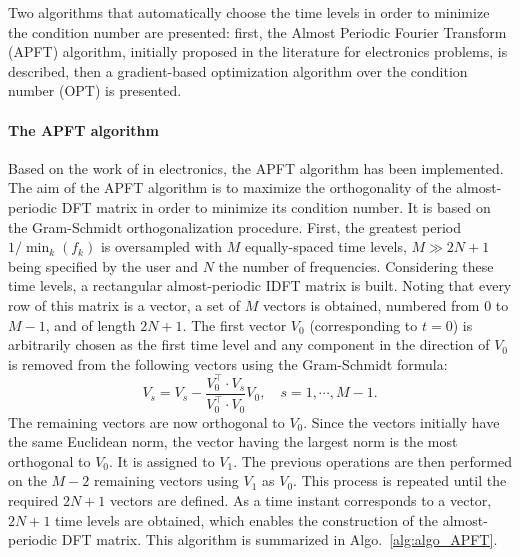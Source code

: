 
Two algorithms that automatically choose the time levels in order to
minimize the condition number are presented: first, the Almost
Periodic Fourier Transform (APFT) algorithm, initially proposed in the
 literature for electronics problems, is described, then a gradient-based
optimization algorithm over the condition number (OPT) is presented.

\paragraph{The APFT algorithm}
\label{sec:apft_algorithm}

Based on the work of \citet{Kundert1988} in
electronics, the APFT algorithm has been implemented.  The aim of the
APFT algorithm is to maximize the orthogonality of the almost-periodic
DFT matrix in order to minimize its condition number.  It is based on
the Gram-Schmidt orthogonalization procedure.  First, the greatest
period $1/\min_k(f_k)$ is oversampled with $M$ equally-spaced time
levels, $M\gg2N+1$ being specified by the user and $N$ the number of
frequencies. Considering these time levels, a rectangular
almost-periodic IDFT matrix is built. Noting that every row of this
matrix is a vector, a set of $M$ vectors is obtained, numbered from 0
to $M-1$, and of length $2N+1$. The first vector $V_0$ (corresponding
to $t=0$) is arbitrarily chosen as the first time level and any
component in the direction of $V_0$ is removed from the following
vectors using the Gram-Schmidt formula:
\begin{equation}
   V_s = V_s - \frac{V_0^\top \cdot V_s}{V_0^\top \cdot V_0} V_0, \quad s=1,\cdots,M-1.
   \label{GramSchmidtAlgo}
\end{equation}
The remaining vectors are now orthogonal to $V_0$.  Since the vectors 
initially have the same Euclidean norm, the vector having the largest
norm is the most orthogonal to $V_0$.  It is assigned to $V_1$. The previous
operations are then performed on the $M-2$ remaining vectors using $V_1$
as $V_0$. This process is repeated until the required $2N+1$ vectors
are defined. As a time instant corresponds to a vector, $2N+1$ time levels are obtained, 
which enables the construction of the almost-periodic
DFT matrix. This algorithm is summarized in
Algo.~\ref{alg:algo_APFT}.

